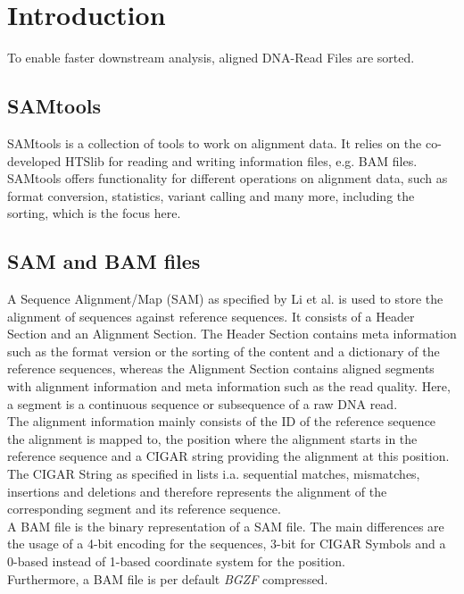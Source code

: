 \section{Introduction}
To enable faster downstream analysis, aligned DNA-Read Files are sorted.

\subsection{SAMtools}
SAMtools \cite{12ySamtools} is a collection of tools to work on alignment data. It relies on the co-developed HTSlib \cite{bonfield_htslib_2021} for reading and writing information files, e.g. BAM files. SAMtools offers functionality for different operations on alignment data, such as format conversion, statistics, variant calling and many more, including the sorting, which is the focus here.

\subsection{SAM and BAM files}
A Sequence Alignment/Map (SAM) as specified by Li et al. \cite{samformat} is used to store the alignment of sequences against reference sequences. It consists of a Header Section and an Alignment Section. The Header Section contains meta information such as the format version or the sorting of the content and a dictionary of the reference sequences, whereas the Alignment Section contains aligned segments with alignment information and meta information such as the read quality. Here, a segment is a continuous sequence or subsequence of a raw DNA read. \\
The alignment information mainly consists of the ID of the reference sequence the alignment is mapped to, the position where the alignment starts in the reference sequence and a CIGAR string providing the alignment at this position. The CIGAR String as specified in \cite{samformat} lists i.a. sequential matches, mismatches, insertions and deletions and therefore represents the alignment of the corresponding segment and its reference sequence. \\
A BAM file is the binary representation of a SAM file. The main differences are the usage of a 4-bit encoding for the sequences, 3-bit for CIGAR Symbols and a 0-based instead of 1-based coordinate system for the position. \\
Furthermore, a BAM file is per default \textit{BGZF} compressed.

